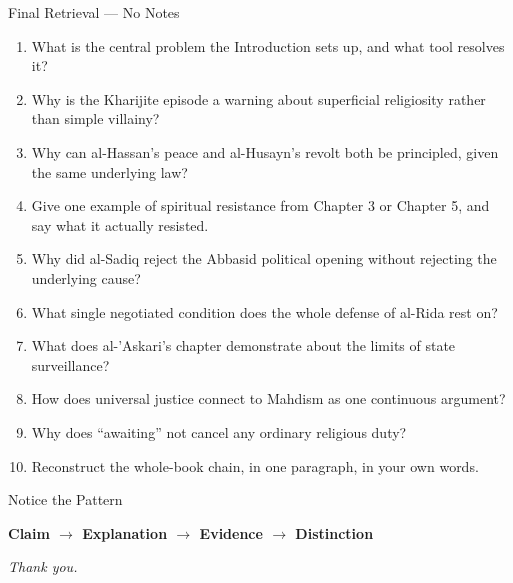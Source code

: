 \begin{frame}{Final Retrieval --- No Notes}
\footnotesize
\begin{enumerate}[label=\arabic*.,itemsep=6pt]
  \item What is the central problem the Introduction sets up, and what tool resolves it?
  \item Why is the Kharijite episode a warning about superficial religiosity rather than simple villainy?
  \item Why can al-Hassan's peace and al-Husayn's revolt both be principled, given the same underlying law?
  \item Give one example of spiritual resistance from Chapter 3 or Chapter 5, and say what it actually resisted.
  \item Why did al-Sadiq reject the Abbasid political opening without rejecting the underlying cause?
  \item What single negotiated condition does the whole defense of al-Rida rest on?
  \item What does al-'Askari's chapter demonstrate about the limits of state surveillance?
  \item How does universal justice connect to Mahdism as one continuous argument?
  \item Why does ``awaiting'' not cancel any ordinary religious duty?
  \item Reconstruct the whole-book chain, in one paragraph, in your own words.
\end{enumerate}
\end{frame}

\begin{frame}{Notice the Pattern}
\vspace{0.5cm}
\begin{center}
{\large\color{deepteal}\bfseries Claim $\rightarrow$ Explanation $\rightarrow$ Evidence $\rightarrow$ Distinction}
\end{center}
\vspace{1em}
{\centering\color{softgray}\itshape Thank you.\par}
\end{frame}
